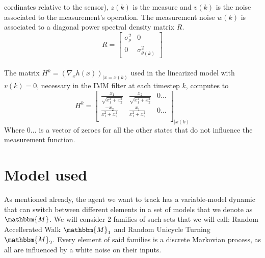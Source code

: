 \documentclass[twocolumn]{article}
\begin{document}
    cordinates relative to the sensor), $z(k)$ is the measure and $v(k)$ is the noise associated to the measurement's operation. The measurement noise $w(k)$ is associated 
    to a diagonal power spectral density matrix $R$.
    \begin{equation*}
        R=\begin{bmatrix}
            \sigma^{2}_{\rho}&0\\
            0&\sigma^{2}_{\theta (k)}
        \end{bmatrix}
    \end{equation*}
    \\
   The matrix $H^{k}=(\nabla_{x} h(x))_{|x=x(k)}$ used in the linearized model with $v(k)=0$, necessary in the IMM filter at each timestep $k$,
   computes to 
    \begin{equation*}
        H^{k}= \begin{bmatrix}
            \frac{x_{1}}{\sqrt{x_{1}^{2}+x_{2}^{2}}} & \frac{x_{2}}{\sqrt{x_{1}^{2}+x_{2}^{2}}}& 0 \dots\\
            \frac{-x_{2}}{x_{1}^{2}+x_{2}^{2}}  & \frac{x_{1}}{x_{1}^{2}+x_{2}^{2}}& 0 \dots\\
        \end{bmatrix}_{|x(k)}
    \end{equation*}
    Where $0\dots$ is a vector of zeroes for all the other states that do not influence the measurement function.
  
    \section*{Model used}
    As mentioned already, the agent we want to track has a variable-model dynamic that can switch between different elements in a set 
    of models that we denote as $\mathbbm{M}$. We will consider 2 families of such sets that we will call: Random Accellerated Walk $\mathbbm{M}_{1}$ 
    and Random Unicycle Turning $\mathbbm{M}_{2}$. Every element of said families is a discrete Markovian process, as all are influenced by a white 
    noise on their inputs.
\end{document}

